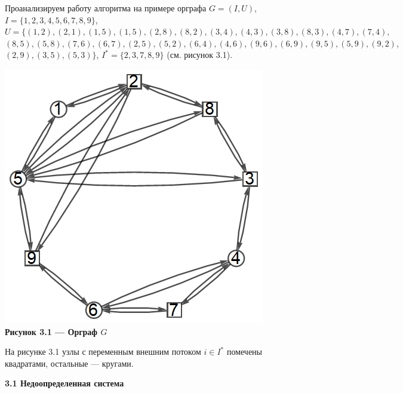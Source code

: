 \documentclass[14pt]{extarticle}%
\begin{document}
Проанализируем работу алгоритма на примере орграфа $G=(I,U)$,\\ $I=\{1,2,3,4,5,6,7,8,9\}$, \\$U=\{(1,2), (2,1), (1,5),(1,5), (2,8),(8,2), (3,4),(4,3), (3,8), (8,3), (4,7),(7,4),$\\ $(8,5), (5,8), (7,6), (6,7), (2,5),(5,2), (6,4),(4,6), (9,6),(6,9), (9,5),(5,9), (9,2),$\\$(2,9), (3,5),(5,3)\}$, $I^*=\{2,3,7,8,9\}$ (см. рисунок 3.1).

\begin{center}
\includegraphics[scale=0.7]{grs/gBase.png}\\
\textbf{Рисунок 3.1 --- Орграф $G$}
\end{center}

На рисунке 3.1 узлы с переменным внешним потоком $i\in I^*$ помечены квадратами, остальные --- кругами.

\textbf{3.1 Недоопределенная система}
\end{document}
